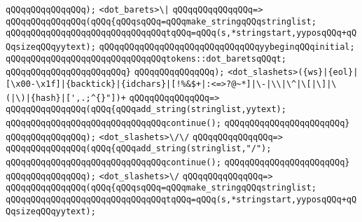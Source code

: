 \verb|qQQqqQQqqQQqqQQq);|\newline
\newline
\verb|<dot_barets>\|\verb#|#\newline
\verb|qQQqqQQqqQQqqQQq=>|\newline
\verb|qQQqqQQqqQQqqQQq(qQQq{qQQqsqQQq=qQQqmake_stringqQQqstringlist;|\newline
\verb|qQQqqQQqqQQqqQQqqQQqqQQqqQQqqQQqtqQQq=qQQq(s,*stringstart,yyposqQQq+qQQqsizeqQQqyytext);|\newline
\verb|qQQqqQQqqQQqqQQqqQQqqQQqqQQqqQQqyybeginqQQqinitial;|\newline
\verb|qQQqqQQqqQQqqQQqqQQqqQQqqQQqqQQqtokens::dot_baretsqQQqt;|\newline
\verb|qQQqqQQqqQQqqQQqqQQqqQQq}|\newline
\verb|qQQqqQQqqQQqqQQq);|\newline
\newline
\newline
\newline
\verb|<dot_slashets>({ws}|\verb#|{eol}|[\x00-\x1f]|{backtick}|{idchars}|[!%&$+|:<=>?@~*]|\-|\\|\^|\[|\]|\(|\)|{hash}|[',.;^{}"])+#\newline
\verb|qQQqqQQqqQQqqQQq=>|\newline
\verb|qQQqqQQqqQQqqQQq(qQQq{qQQqadd_string(stringlist,yytext);|\newline
\verb|qQQqqQQqqQQqqQQqqQQqqQQqqQQqqQQqcontinue();|\newline
\verb|qQQqqQQqqQQqqQQqqQQqqQQq}|\newline
\verb|qQQqqQQqqQQqqQQq);|\newline
\newline
\verb|<dot_slashets>\/\/|\newline
\verb|qQQqqQQqqQQqqQQq=>|\newline
\verb|qQQqqQQqqQQqqQQq(qQQq{qQQqadd_string(stringlist,"/");|\newline
\verb|qQQqqQQqqQQqqQQqqQQqqQQqqQQqqQQqcontinue();|\newline
\verb|qQQqqQQqqQQqqQQqqQQqqQQq}|\newline
\verb|qQQqqQQqqQQqqQQq);|\newline
\newline
\verb|<dot_slashets>\/|\newline
\verb|qQQqqQQqqQQqqQQq=>|\newline
\verb|qQQqqQQqqQQqqQQq(qQQq{qQQqsqQQq=qQQqmake_stringqQQqstringlist;|\newline
\verb|qQQqqQQqqQQqqQQqqQQqqQQqqQQqqQQqtqQQq=qQQq(s,*stringstart,yyposqQQq+qQQqsizeqQQqyytext);|\newline
